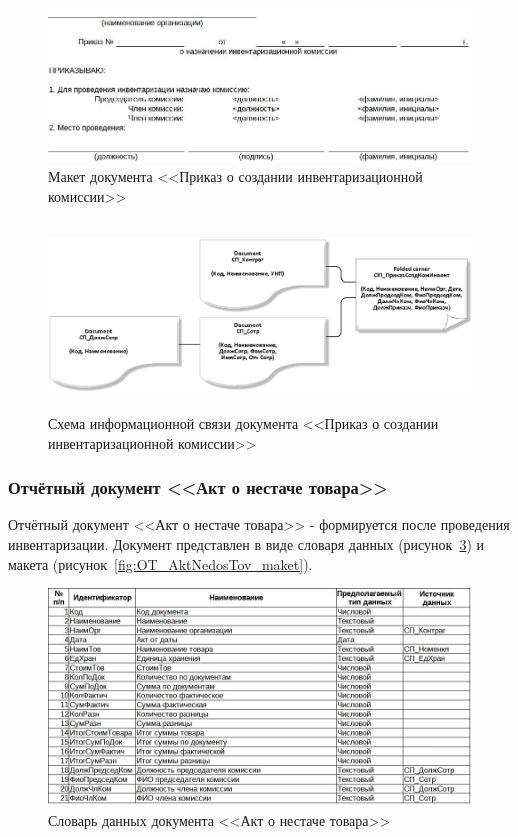 \begin{figure}[!h]
    \centering
    \includegraphics[width=14cm]
        {_docs/ОП_ПриказСоздКомИнвент_макет.jpg}
    \caption{Макет документа <<Приказ о создании инвентаризационной комиссии>>}
    \label{fig:OP_PrikazSozdKomInvest_maket}
\end{figure}

\begin{figure}[!h]
    \centering
    \includegraphics[height=5cm]
        {_docs/ОП_ПриказСоздКомИнвент_связи.png}
    \caption{Схема информационной связи документа <<Приказ о создании инвентаризационной комиссии>>}
    \label{fig:OP_PrikazSozdKomInvest_svazi}
\end{figure}

\newpage
\subsubsection{Отчётный документ <<Акт о нестаче товара>>}

Отчётный документ <<Акт о нестаче товара>>
- формируется после проведения инвентаризации.
Документ представлен в виде словаря данных (рисунок~\ref{fig:OT_AktNedosTov_tipi})
и макета (рисунок~\ref{fig:OT_AktNedosTov_maket}).

\begin{figure}[!h]
    \centering
    \includegraphics[width=14cm]
        {_docs/ОТ_АктНедосТов_типы.jpg}
    \caption{Словарь данных документа <<Акт о нестаче товара>>}
    \label{fig:OT_AktNedosTov_tipi}
\end{figure}

